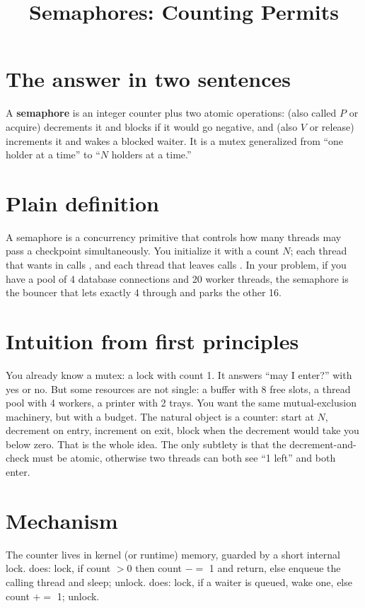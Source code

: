 \documentclass[11pt]{article}
\title{Semaphores: Counting Permits}
\author{}
\date{}
\begin{document}
\maketitle

\section{The answer in two sentences}
A \textbf{semaphore} is an integer counter plus two atomic operations:  (also called $P$ or acquire) decrements it and blocks if it would go negative, and  (also $V$ or release) increments it and wakes a blocked waiter. It is a mutex generalized from ``one holder at a time'' to ``$N$ holders at a time.''

\section{Plain definition}
A semaphore is a concurrency primitive that controls how many threads may pass a checkpoint simultaneously. You initialize it with a count $N$; each thread that wants in calls , and each thread that leaves calls . In your problem, if you have a pool of 4 database connections and 20 worker threads, the semaphore is the bouncer that lets exactly 4 through and parks the other 16.

\section{Intuition from first principles}
You already know a mutex: a lock with count 1. It answers ``may I enter?'' with yes or no. But some resources are not single: a buffer with 8 free slots, a thread pool with 4 workers, a printer with 2 trays. You want the same mutual-exclusion machinery, but with a budget. The natural object is a counter: start at $N$, decrement on entry, increment on exit, block when the decrement would take you below zero. That is the whole idea. The only subtlety is that the decrement-and-check must be atomic, otherwise two threads can both see ``1 left'' and both enter.

\section{Mechanism}
The counter lives in kernel (or runtime) memory, guarded by a short internal lock.  does: lock, if count $> 0$ then count $-=$ 1 and return, else enqueue the calling thread and sleep; unlock.  does: lock, if a waiter is queued, wake one, else count $+=$ 1; unlock. 
\end{document}
